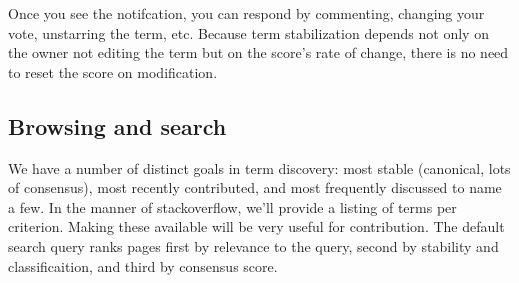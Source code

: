 \documentclass[letter]{article}
\begin{document}
Once you see the notifcation, you can respond by commenting, changing your vote, unstarring the term,
etc. Because term stabilization depends not only on the owner not editing the term but on the score's
rate of change, there is no need to reset the score on modification. 

\subsection{Browsing and search}
We have a number of distinct goals in term discovery: most stable (canonical, lots of consensus), 
most recently contributed, and most frequently discussed to name a few. In the manner of stackoverflow, 
we'll provide a listing of terms per criterion. Making these available will be very useful for  contribution. 
The default search query ranks pages first by 
relevance to the query, second by stability and classificaition, and third by consensus score. 
\end{document}
